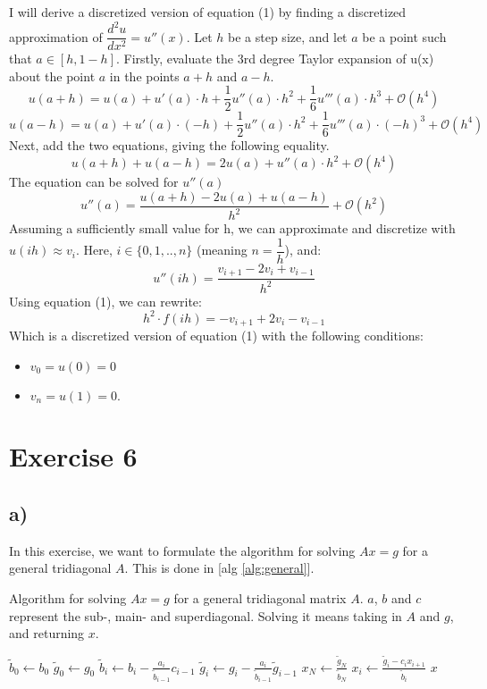 \documentclass[11pt]{article} %
\begin{document}
I will derive a discretized version of equation (1) by finding a discretized approximation of \(\dfrac{d^2u}{dx^2}=u''(x)\).  
Let \(h\) be a step size, and let \(a\) be a point such that \(a \in [h, 1-h]\). Firstly, evaluate the 3rd degree Taylor expansion of u(x) about the point \(a\) in the points \(a+h\) and \(a-h\).
\[u(a+h) =u(a) + u'(a)\cdot h + \dfrac{1}{2}u''(a) \cdot h^2 + \dfrac{1}{6}u'''(a) \cdot h^3 + \mathcal{O}(h^4) \]
\[u(a-h) =u(a) + u'(a)\cdot (-h) + \dfrac{1}{2}u''(a) \cdot h^2 + \dfrac{1}{6}u'''(a) \cdot (-h)^3 + \mathcal{O}(h^4) \]
Next, add the two equations, giving the following equality.
\[ u(a+h) + u(a-h) = 2u(a) + u''(a)\cdot h^2 + \mathcal{O}(h^4) \]
The equation can be solved for \(u''(a)\)
\[u''(a) = \dfrac{u(a+h) - 2u(a) +u(a-h)}{h^2} + \mathcal{O}(h^2) \]
Assuming a sufficiently small value for h, we can approximate and discretize with \(u(ih) \approx v_i\). Here, \(i \in \{0, 1, .., n\}\) (meaning \(n=\dfrac{1}{h}\)), and:
\[u''(ih) = \dfrac{v_{i+1} - 2v_i +v_{i-1}}{h^2} \]
Using equation (1), we can rewrite:
\begin{equation}h^2 \cdot f(ih) = -v_{i+1} + 2v_i - v_{i-1}\end{equation}
Which is a discretized version of equation (1) with the following conditions:
\begin{itemize}
	\item \(v_0=u(0)=0\) 
	\item \(v_{n}=u(1)=0\).
\end{itemize}

\section*{Exercise 6}

\subsection*{a)}

In this exercise, we want to formulate the algorithm for solving $Ax = g$ for a general tridiagonal $A$. This is done in [alg \ref{alg:general}].

\begin{algorithm}
\caption{Algorithm for solving $Ax = g$ for a general tridiagonal matrix $A$. $a$, $b$ and $c$ represent the sub-, main- and superdiagonal. Solving it means taking in $A$ and $g$, and returning $x$.}
\begin{algorithmic}[0]
    \State $\tilde{b}_0 \gets b_0$
    \State $\tilde{g}_0 \gets g_0$
        \State $\tilde{b}_i \gets b_i - \frac{a_i}{\tilde{b}_{i-1}} c_{i-1}$
        \State $\tilde{g}_i \gets g_i - \frac{a_i}{\tilde{b}_{i-1}} \tilde{g}_{i-1}$
    \EndFor
    \State $x_N \gets \frac{\tilde{g}_N}{\tilde{b}_N}$
        \State $x_i \gets \frac{\tilde{g}_i - c_i x_{i+1}}{\tilde{b}_i}$
    \EndFor
    \State \Return $x$
\EndProcedure
\end{algorithmic}
\label{alg:general}
\end{algorithm}
\end{document}
